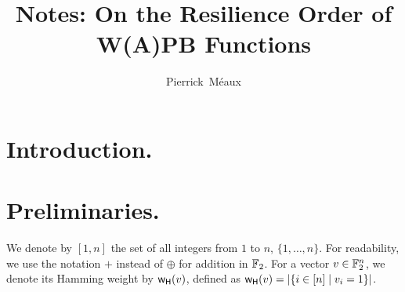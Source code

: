 \documentclass[11pt]{llncs}
\begin{document}
\title{Notes: On the Resilience Order of W(A)PB Functions}





	\author{
		\mbox{Pierrick M\'eaux}
	}








	\maketitle



 \setcounter{page}{1}

\begin{abstract}



\end{abstract}

\section{Introduction.}


\section{Preliminaries.}


We denote by $[1,n]$ the set of all integers from $1$ to $n$, \ie $\{1,\ldots,n\}$.
For readability, we use the notation $+$ instead of $\oplus$ for addition in $\mathbb{F}_2$.
For a vector $v \in \mathbb{F}_2^n$, we denote its Hamming weight by $\mathsf{w_H}(v)$, defined as $\mathsf{w_H}(v) = |\{ i \in [n] \mid v_i = 1 \}|$.



\end{document}
